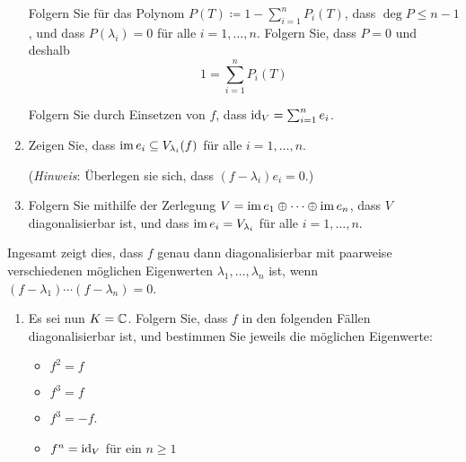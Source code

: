 \documentclass[a4paper,10pt]{scrartcl}
\begin{document}
\begin{question}
\begin{enumerate}[resume]
      Folgern Sie für das Polynom $P(T) \coloneqq 1 - \sum_{i=1}^n P_i(T)$, dass $\deg P \leq n-1$, und dass $P(\lambda_i) = 0$ für alle $i = 1, \dotsc, n$.
      Folgern Sie, dass $P = 0$ und deshalb
      \[
          1
        = \sum_{i=1}^n P_i(T)
      \]
      
      Folgern Sie durch Einsetzen von $f$, dass $\operatorname{id}_V = \sum_{i=1}^n e_i$.
    \item
      Zeigen Sie, dass $\operatorname{im} e_i \subseteq V_{\lambda_i}(f)$ für alle $i = 1, \dotsc, n$.
      
      (\emph{Hinweis}:
       Überlegen sie sich, dass $(f - \lambda_i) e_i = 0$.)
    \item
      Folgern Sie mithilfe der Zerlegung $V = \operatorname{im} e_1 \oplus \dotsb \oplus \operatorname{im} e_n$, dass $V$ diagonalisierbar ist, und dass $\operatorname{im} e_i = V_{\lambda_i}$ für alle $i = 1, \dotsc, n$.
  \end{enumerate}
  Ingesamt zeigt dies, dass $f$ genau dann diagonalisierbar mit paarweise verschiedenen möglichen Eigenwerten $\lambda_1, \dotsc, \lambda_n$ ist, wenn $(f - \lambda_1) \dotsm (f - \lambda_n) = 0$.
  \begin{enumerate}[resume]
    \item 
      Es sei nun $K = \mathbb{C}$.
      Folgern Sie, dass $f$ in den folgenden Fällen diagonalisierbar ist, und bestimmen Sie jeweils die möglichen Eigenwerte:
      \begin{itemize}
        \item
          $f^2 = f$

        \item
          $f^3 = f$
        \item
          $f^3 = -f$.
        \item
          $f^n = \operatorname{id}_V$ für ein $n \geq 1$
      \end{itemize}
  \end{enumerate}
\end{question}










\end{document}
